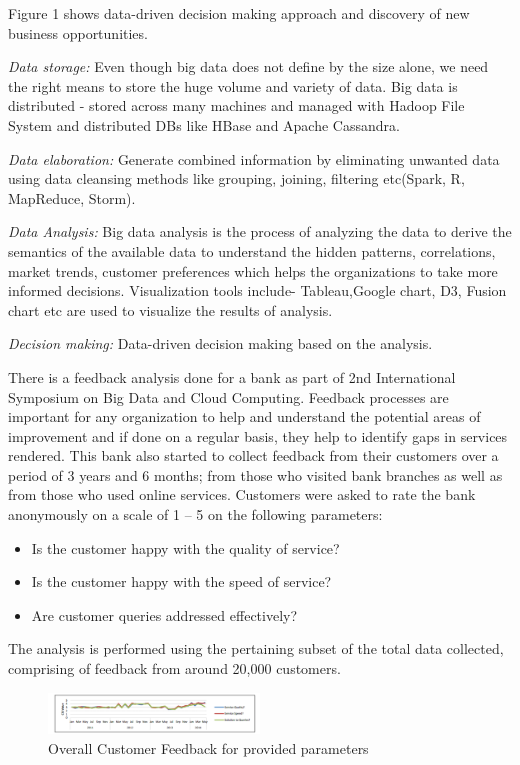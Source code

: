 \documentclass[sigconf]{acmart}
\begin{document}
Figure 1 shows data-driven decision making approach and discovery of new business opportunities.

\textit{Data storage:} Even though big data does not define by the size alone, we need the right means to store the huge volume and variety of data. Big data is distributed - stored across many machines and managed with Hadoop File System and distributed DBs like HBase and Apache Cassandra\cite{Big-data-storage}.

\textit{Data elaboration:} Generate combined information by eliminating unwanted data using data cleansing methods like grouping, joining, filtering etc(Spark, R, MapReduce, Storm). 

\textit{Data Analysis:} Big data analysis is the process of analyzing the data to derive the semantics of the available data to understand the hidden patterns, correlations, market trends, customer preferences which helps the organizations to take more informed decisions. Visualization tools include- Tableau,Google chart, D3, Fusion chart etc are used to visualize the results of analysis.

\textit{Decision making:} Data-driven decision making based on the analysis.
 
 There is a feedback analysis done for a bank as part of 2nd International Symposium on Big Data and Cloud Computing. Feedback processes are important for any organization to help and understand the potential areas of improvement and if done on a regular basis, they help to identify gaps in services rendered. This bank also started to collect feedback from their customers over a period of 3 years and 6 months; from those who visited bank branches as well as from those who used online services. Customers were asked to rate the bank anonymously on a scale of 1 – 5 on the following parameters: 
 
\begin{itemize}
   \item Is the customer happy with the quality of service?
   \item Is the customer happy with the speed of service?
   \item Are customer queries addressed effectively?
\end{itemize}

The analysis is performed using the pertaining subset of the total data collected, comprising of feedback from around 20,000 customers\cite{bigdata-banking}. 

\begin{figure}
  \centering
  \includegraphics[width=0.5\textwidth]{images/Figure2.png}
  \caption{Overall Customer Feedback for provided parameters 
  \cite{bigdata-banking}}
  \label{fig:Figure2} 
\end{figure}
\end{document}
